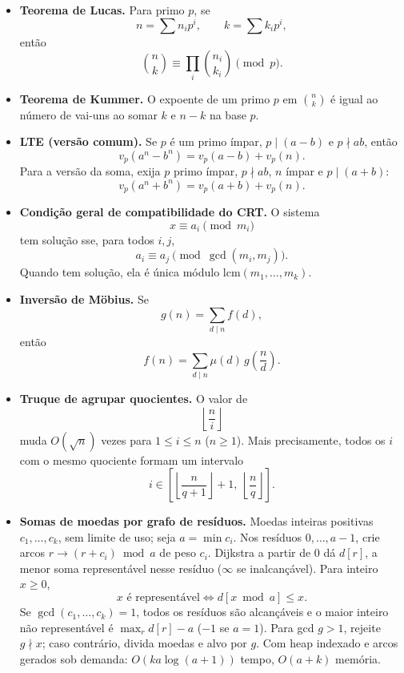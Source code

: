 \begin{itemize}[leftmargin=*,label={}]
	\item \textbf{Teorema de Lucas.}
		Para primo $p$, se
		\[
			n = \sum n_i p^i,\qquad k = \sum k_i p^i,
		\]
		então
		\[
			\binom{n}{k} \equiv \prod_i \binom{n_i}{k_i} \pmod p.
		\]

	\item \textbf{Teorema de Kummer.}
		O expoente de um primo $p$ em $\binom{n}{k}$ é igual ao número de vai-uns ao somar $k$ e $n-k$ na base $p$.

	\item \textbf{LTE (versão comum).}
		Se $p$ é um primo ímpar, $p \mid (a-b)$ e $p \nmid ab$, então
		\[
			v_p(a^n-b^n)=v_p(a-b)+v_p(n).
		\]
		Para a versão da soma, exija $p$ primo ímpar, $p\nmid ab$, $n$ ímpar e $p\mid(a+b)$:
		\[
			v_p(a^n+b^n)=v_p(a+b)+v_p(n).
		\]

		\ifextended
	\item \textbf{Condição geral de compatibilidade do CRT.}
		O sistema
		\[
			x \equiv a_i \pmod{m_i}
		\]
		tem solução sse, para todos $i,j$,
		\[
			a_i \equiv a_j \pmod{\gcd(m_i,m_j)}.
		\]
		Quando tem solução, ela é única módulo $\mathrm{lcm}(m_1,\dots,m_k)$.
		\fi

	\item \textbf{Inversão de Möbius.}
		Se
		\[
			g(n)=\sum_{d \mid n} f(d),
		\]
		então
		\[
			f(n)=\sum_{d \mid n} \mu(d)\, g\!\left(\frac{n}{d}\right).
		\]

		\ifextended
	\item \textbf{Truque de agrupar quocientes.}
		O valor de
		\[
			\left\lfloor \frac{n}{i}\right\rfloor
		\]
		muda $O(\sqrt n)$ vezes para $1\le i\le n$ ($n\ge1$). Mais precisamente, todos os $i$ com o mesmo quociente formam um intervalo
		\[
			i \in \left[\left\lfloor \frac{n}{q+1}\right\rfloor+1,\ \left\lfloor \frac{n}{q}\right\rfloor\right].
		\]
		\fi

	\ifextended
\item \textbf{Somas de moedas por grafo de resíduos.}
Moedas inteiras positivas $c_1,\ldots,c_k$, sem limite de uso; seja $a=\min c_i$. Nos resíduos $0,\ldots,a-1$, crie arcos $r\to(r+c_i)\bmod a$ de peso $c_i$. Dijkstra a partir de 0 dá $d[r]$, a menor soma representável nesse resíduo ($\infty$ se inalcançável). Para inteiro $x\ge0$,
\[
x\text{ é representável}\iff d[x\bmod a]\le x.
\]
Se $\gcd(c_1,\ldots,c_k)=1$, todos os resíduos são alcançáveis e o maior inteiro não representável é $\max_r d[r]-a$ ($-1$ se $a=1$). Para gcd $g>1$, rejeite $g\nmid x$; caso contrário, divida moedas e alvo por $g$. Com heap indexado e arcos gerados sob demanda: $O(ka\log(a+1))$ tempo, $O(a+k)$ memória.
\fi


\end{itemize}
